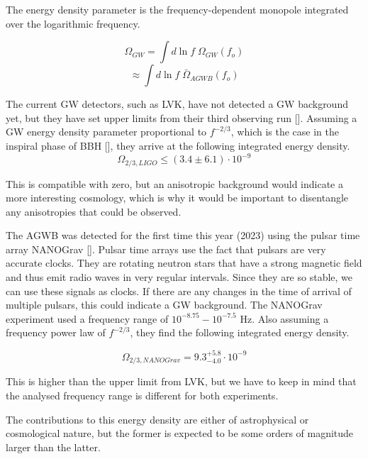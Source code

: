 The energy density parameter is the frequency-dependent monopole integrated over the logarithmic frequency.

\begin{equation}
    \Omega_{GW} = \int d\ln f \; \Omega_{GW}(f_o) 
\end{equation}
\begin{equation}
    \approx \int d\ln f \; \bar{\Omega}_{AGWB}(f_o)
\end{equation}


The current GW detectors, such as LVK, have not detected a GW background yet, but they have set upper limits from their third observing run [\cite{abbott_upper_2021}]. Assuming a GW energy density parameter proportional to $f^{-2/3}$, which is the case in the inspiral phase of BBH [\cite{phinney_practical_2001}], they arrive at the following integrated energy density.
\begin{equation}
    \Omega_{2/3, LIGO} \leq (3.4 \pm 6.1) \cdot 10^{-9}
\end{equation}

This is compatible with zero, but an anisotropic background would indicate
a more interesting cosmology, which is why it would be important to disentangle
any anisotropies that could be observed.

The AGWB was detected for the first time this year (2023) using the pulsar time array NANOGrav [\cite{agazie_nanograv_2023}]. Pulsar time arrays use the fact that pulsars are very accurate clocks. They are rotating neutron stars that have a strong magnetic field and thus emit radio waves in very regular intervals. Since they are so stable, we can use these signals as clocks. If there are any changes in the time of arrival of multiple pulsars, this could indicate a GW background. The NANOGrav experiment used a frequency range of $10^{-8.75} - 10^{-7.5}$ Hz. 
Also assuming a frequency power law of $f^{-2/3}$, they find the following integrated energy density.

\begin{equation}
    \Omega_{2/3, NANOGrav} = 9.3^{+5.8}_{-4.0}\cdot 10^{-9}
\end{equation}

This is higher than the upper limit from LVK, but we have to keep in mind that the analysed frequency range is different for both experiments.

The contributions to this energy density are either of astrophysical or cosmological nature, but the former is expected to be some orders of magnitude larger than the latter.

